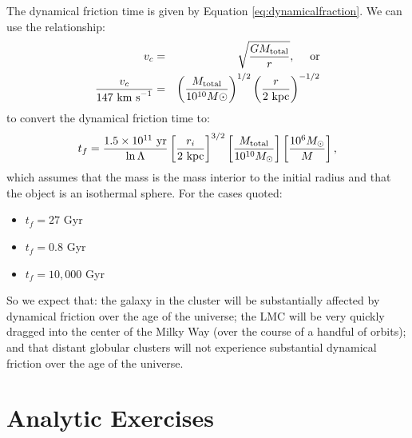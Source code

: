 \begin{enumerate}
\begin{answer}
The dynamical friction time is given by Equation
\ref{eq:dynamicalfraction}.
We can use the relationship:
\begin{eqnarray}
v_c &=& \sqrt{\frac{GM_{\rm total}}{r}}, \mathrm{\quad~or} \cr
\frac{v_c}{147 {\rm ~km~s}^{-1}} &=&
\left( \frac{M_{\rm total}}{10^{10} M\odot} \right)^{1/2}
\left( \frac{r}{2 {\rm ~kpc}} \right)^{-1/2}
\end{eqnarray}
to convert the dynamical friction time to:
\begin{equation}
t_{f} = \frac{1.5 \times
10^{11} \mathrm{~yr}}{\ln \Lambda} \left[\frac{r_i}{2\mathrm{~kpc}}\right]^{3/2}
\left[\frac{M_{\rm total}}{10^{10} M_\odot} \right]
\left[\frac{10^6 M_\odot}{M}\right],
\end{equation}
which assumes that the mass is the mass interior to the initial radius
and that the object is an isothermal sphere.
For the cases quoted:
\begin{itemize}
\item $t_f = 27$ Gyr
\item $t_f = 0.8$ Gyr
\item $t_f = 10,000$ Gyr
\end{itemize}
So we expect that: the galaxy in the cluster will be substantially
affected by dynamical friction over the age of the universe; the LMC
will be very quickly dragged into the center of the Milky Way (over
the course of a handful of orbits); and that distant globular clusters
will not experience substantial dynamical friction over the age of the
universe.
\end{answer}
\end{enumerate}   

\section{Analytic Exercises}

